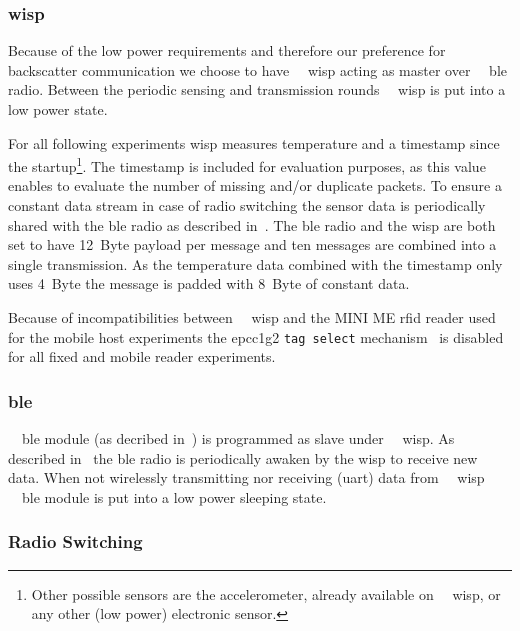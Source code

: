 \documentclass[conference,letterpaper,twoside,final,10pt]{IEEEtran}
\begin{document}
\subsubsection{\acl{wisp}}
\label{sec:software/wisp}

Because of the low power requirements and therefore our preference for backscatter communication we choose to have {~~}\ac{wisp} acting as master over {~~}\ac{ble} radio.
Between the periodic sensing and transmission rounds {~~}\ac{wisp} is put into a low power state.

For all following experiments \ac{wisp} measures temperature and a timestamp since the startup\footnote{Other possible sensors are the accelerometer, already available on {~~}\ac{wisp}, or any other (low power) electronic sensor.}.
The timestamp is included for evaluation purposes, as this value enables to evaluate the number of missing and/or duplicate packets.
To ensure a constant data stream in case of radio switching the sensor data is periodically shared with the \ac{ble} radio as described in~.
The \ac{ble} radio and the \ac{wisp} are both set to have \SI{12}{Byte} payload per message and ten messages are combined into a single transmission.
As the temperature data combined with the timestamp only uses \SI{4}{Byte} the message is padded with \SI{8}{Byte} of constant data.

Because of incompatibilities between {~~}\ac{wisp} and the MINI ME \ac{rfid} reader used for the mobile host experiments the \ac{epcc1g2} \texttt{tag select} mechanism~\cite[Sec. 6.3.2.3]{epcglobal2013gen2} is disabled for all fixed and mobile reader experiments.

\subsubsection{\acl{ble}}
\label{sec:software/ble}

{~~}\ac{ble} module (as decribed in~) is programmed as slave under {~~}\ac{wisp}.
As described in~ the \ac{ble} radio is periodically awaken by the \ac{wisp} to receive new data.
When not wirelessly transmitting nor receiving (\ac{uart}) data from {~~}\ac{wisp} {~~}\ac{ble} module is put into a low power sleeping state.

\subsubsection{Radio Switching}
\label{sec:software/switching}
\end{document}
